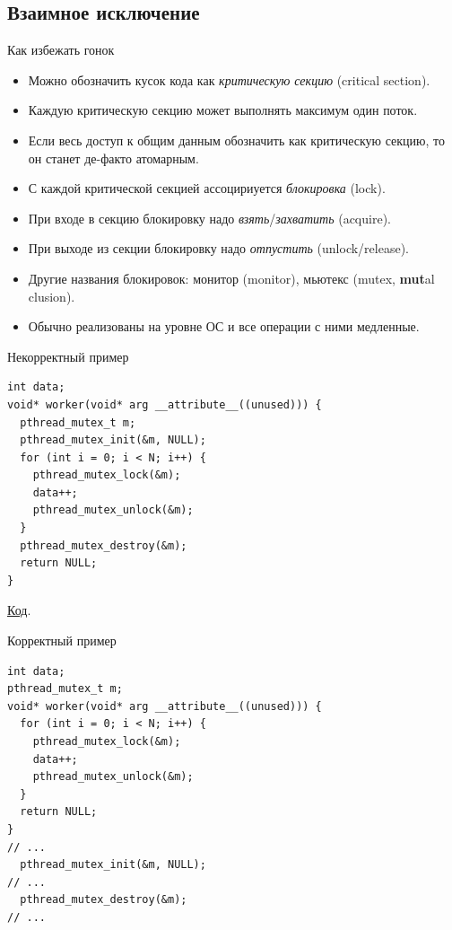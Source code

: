 \subsection{Взаимное исключение}

\begin{frame}
\end{frame}

\begin{frame}{Как избежать гонок}
	\begin{itemize}
		\item Можно обозначить кусок кода как \textit{критическую секцию} (critical section).
		\item Каждую критическую секцию может выполнять максимум один поток.
		\item
			Если весь доступ к общим данным обозначить как критическую секцию,
			то он станет де-факто атомарным.
		\item С каждой критической секцией ассоцириуется \textit{блокировка} (lock).
		\item При входе в секцию блокировку надо \textit{взять}/\textit{захватить} (acquire).
		\item При выходе из секции блокировку надо \textit{отпустить} (unlock/release).
		\item Другие названия блокировок: монитор (monitor), мьютекс (mutex, \textbf{mut}al clusion).
		\item Обычно реализованы на уровне ОС и все операции с ними медленные.
	\end{itemize}
\end{frame}

\begin{frame}[fragile]{Некорректный пример}
\begin{verbatim}
int data;
void* worker(void* arg __attribute__((unused))) {
  pthread_mutex_t m;
  pthread_mutex_init(&m, NULL);
  for (int i = 0; i < N; i++) {
    pthread_mutex_lock(&m);
    data++;
    pthread_mutex_unlock(&m);
  }
  pthread_mutex_destroy(&m);
  return NULL;
}
\end{verbatim}
\href{https://github.com/yeputons/fall-2016-paradigms/raw/master/161019/sources/09-two-threads-bad-mutex.c}{Код}.
\end{frame}

\begin{frame}[fragile]{Корректный пример}
\begin{verbatim}
int data;
pthread_mutex_t m;
void* worker(void* arg __attribute__((unused))) {
  for (int i = 0; i < N; i++) {
    pthread_mutex_lock(&m);
    data++;
    pthread_mutex_unlock(&m);
  }
  return NULL;
}
// ...
  pthread_mutex_init(&m, NULL);
// ...
  pthread_mutex_destroy(&m);
// ...
\end{verbatim}
\end{frame}

